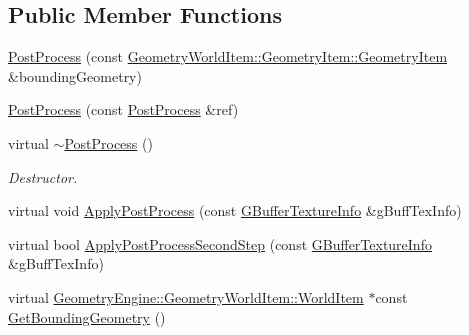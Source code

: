 \subsection*{Public Member Functions}
\begin{DoxyCompactItemize}
\item 
\mbox{\hyperlink{class_geometry_engine_1_1_geometry_post_process_1_1_post_process_a3df1b89c25bd790e3ded93e088aca222}{Post\+Process}} (const \mbox{\hyperlink{class_geometry_engine_1_1_geometry_world_item_1_1_geometry_item_1_1_geometry_item}{Geometry\+World\+Item\+::\+Geometry\+Item\+::\+Geometry\+Item}} \&bounding\+Geometry)
\item 
\mbox{\hyperlink{class_geometry_engine_1_1_geometry_post_process_1_1_post_process_af5599c4257746130644eb6beb421a25a}{Post\+Process}} (const \mbox{\hyperlink{class_geometry_engine_1_1_geometry_post_process_1_1_post_process}{Post\+Process}} \&ref)
\item 
\mbox{\label{class_geometry_engine_1_1_geometry_post_process_1_1_post_process_ae50dbe0c834a713d1f3163f9706b2e91}} 
virtual \mbox{\hyperlink{class_geometry_engine_1_1_geometry_post_process_1_1_post_process_ae50dbe0c834a713d1f3163f9706b2e91}{$\sim$\+Post\+Process}} ()
\begin{DoxyCompactList}\small\item\em Destructor. \end{DoxyCompactList}\item 
virtual void \mbox{\hyperlink{class_geometry_engine_1_1_geometry_post_process_1_1_post_process_a2dbb157265ebdeea658982673e757d46}{Apply\+Post\+Process}} (const \mbox{\hyperlink{struct_geometry_engine_1_1_g_buffer_texture_info}{G\+Buffer\+Texture\+Info}} \&g\+Buff\+Tex\+Info)
\item 
virtual bool \mbox{\hyperlink{class_geometry_engine_1_1_geometry_post_process_1_1_post_process_a3657f263948ecee70314c859e15412e1}{Apply\+Post\+Process\+Second\+Step}} (const \mbox{\hyperlink{struct_geometry_engine_1_1_g_buffer_texture_info}{G\+Buffer\+Texture\+Info}} \&g\+Buff\+Tex\+Info)
\item 
\mbox{\label{class_geometry_engine_1_1_geometry_post_process_1_1_post_process_a19b7d991ecfc7af8f9ca2c9f79488b9a}} 
virtual \mbox{\hyperlink{class_geometry_engine_1_1_geometry_world_item_1_1_world_item}{Geometry\+Engine\+::\+Geometry\+World\+Item\+::\+World\+Item}} $\ast$const \mbox{\hyperlink{class_geometry_engine_1_1_geometry_post_process_1_1_post_process_a19b7d991ecfc7af8f9ca2c9f79488b9a}{Get\+Bounding\+Geometry}} ()

\end{DoxyCompactItemize}
